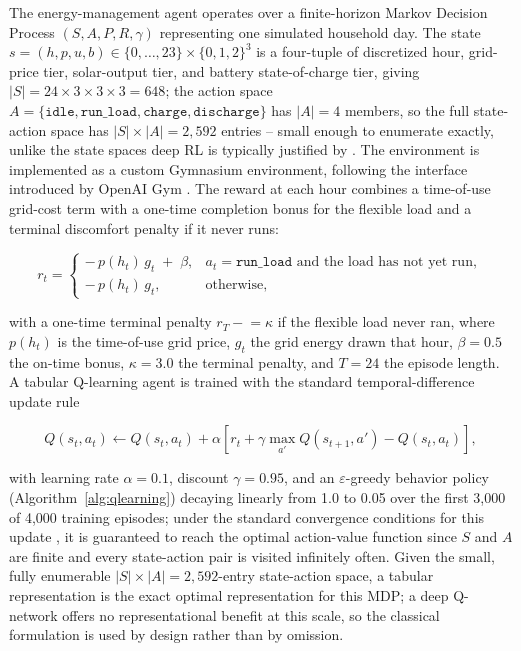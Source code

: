 \documentclass[11pt,a4paper]{article}
\begin{document}
The energy-management agent operates over a finite-horizon Markov Decision Process $(S, A, P, R, \gamma)$ \citep{bellman1957} representing one simulated household day. The state $s=(h,p,u,b) \in \{0,\dots,23\} \times \{0,1,2\}^3$ is a four-tuple of discretized hour, grid-price tier, solar-output tier, and battery state-of-charge tier, giving $|S|=24\times3\times3\times3=648$; the action space $A=\{\texttt{idle}, \texttt{run\_load}, \texttt{charge}, \texttt{discharge}\}$ has $|A|=4$ members, so the full state-action space has $|S|\times|A|=2{,}592$ entries -- small enough to enumerate exactly, unlike the state spaces deep RL is typically justified by \citep{mnih2015,vazquezcanteli2019}. The environment is implemented as a custom Gymnasium \citep{towers2024} environment, following the interface introduced by OpenAI Gym \citep{brockman2016}. The reward at each hour combines a time-of-use grid-cost term with a one-time completion bonus for the flexible load and a terminal discomfort penalty if it never runs:

\begin{equation}
r_t =
\begin{cases}
-\,p(h_t)\,g_t \;+\; \beta, & a_t = \texttt{run\_load} \text{ and the load has not yet run}, \\[2pt]
-\,p(h_t)\,g_t, & \text{otherwise},
\end{cases}
\label{eq:reward}
\end{equation}

with a one-time terminal penalty $r_T \mathrel{-}= \kappa$ if the flexible load never ran, where $p(h_t)$ is the time-of-use grid price, $g_t$ the grid energy drawn that hour, $\beta=0.5$ the on-time bonus, $\kappa=3.0$ the terminal penalty, and $T=24$ the episode length. A tabular Q-learning agent \citep{watkins1989,watkins1992} is trained with the standard temporal-difference update rule

\begin{equation}
Q(s_t,a_t) \leftarrow Q(s_t,a_t) + \alpha\left[ r_t + \gamma \max_{a'} Q(s_{t+1},a') - Q(s_t,a_t) \right],
\label{eq:qlearning}
\end{equation}

with learning rate $\alpha=0.1$, discount $\gamma=0.95$, and an $\varepsilon$-greedy behavior policy (Algorithm~\ref{alg:qlearning}) decaying linearly from 1.0 to 0.05 over the first 3,000 of 4,000 training episodes; under the standard convergence conditions for this update \citep{watkins1992}, it is guaranteed to reach the optimal action-value function since $S$ and $A$ are finite and every state-action pair is visited infinitely often. Given the small, fully enumerable $|S|\times|A|=2{,}592$-entry state-action space, a tabular representation is the exact optimal representation for this MDP; a deep Q-network \citep{mnih2015} offers no representational benefit at this scale, so the classical formulation is used by design rather than by omission.
\end{document}
